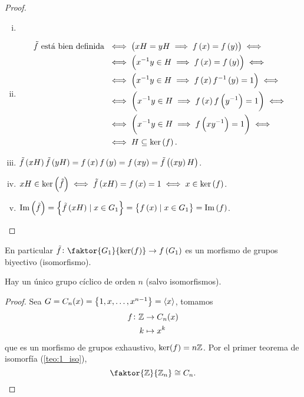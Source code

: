 \begin{proof}
    \begin{enumerate}[i)]
        \item[]
        \item 
            \begin{align*}
                \tilde{f}\text{ está bien definida } &\iff \left( xH=yH\implies f\left( x\right) = f\left( y\right) \right) \iff \\
                &\iff \left( x^{-1}y\in H \implies f\left( x\right) = f\left( y\right) \right) \iff \\
                &\iff \left( x^{-1}y\in H \implies f\left( x\right) f^{-1}\left( y\right) = 1 \right) \iff \\
                &\iff \left( x^{-1}y\in H \implies f\left( x\right) f\left( y^{-1}\right) = 1 \right) \iff \\
                &\iff \left( x^{-1}y\in H \implies f\left( x y^{-1}\right) = 1 \right) \iff \\
                &\iff H\subseteq \ker\left( f\right).
            \end{align*}
        \item $\tilde{f}\left( xH\right)\tilde{f}\left( yH\right)=f\left( x\right) f\left( y\right) = f\left( xy\right) = \tilde{f}\left( \left( xy\right) H\right)$.
        \item $xH\in\ker\left(\tilde{f}\right)\iff\tilde{f}\left( xH\right) = f\left( x\right) = 1\iff x\in\ker\left( f\right)$.
        \item $\operatorname{Im}\left(\tilde{f}\right)=\left\{ \tilde{f}\left( xH\right) \mid x\in G_1\right\} =\left\{ f\left( x\right) \mid x\in G_1\right\} = \operatorname{Im}\left( f\right)$.
    \end{enumerate}

\end{proof}

\begin{col}
    En particular $\tilde{f} \colon \faktor{G_1}{\ker(f)} \to f\left( G_1 \right)$ es un morfismo de
    grupos biyectivo (isomorfismo).
\end{col}

\begin{col}
    Hay un único grupo cíclico de orden $n$ (salvo isomorfismos).
\end{col}

\begin{proof}
    Sea $G = C_n(x) = \left\{ 1, x, \dots, x^{n-1}\right\} = \langle x \rangle$, tomamos
    \[
        \begin{aligned}
            f \colon \mathbb{Z} &\to C_n(x) \\
            k &\mapsto x^k
        \end{aligned}
    \]
    que es un morfismo de grupos exhaustivo, $\ker(f) = n\mathbb{Z}$. Por el primer teorema de isomorfía (\ref{teo:1_iso}),
    \[
        \faktor{\z}{\z_{n}} \cong C_n.
    \]
\end{proof}

